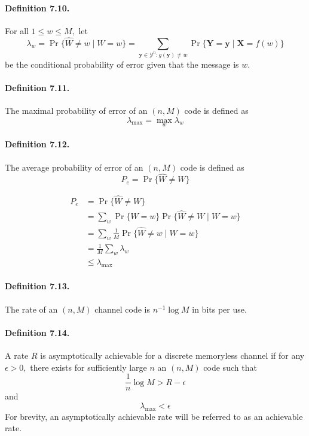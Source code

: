 \documentclass[8pt]{article}
\begin{document}
\begin{tcolorbox}
	\paragraph{Definition 7.10.} For all $1 \leq w \leq M,$ let
	$$
	\lambda_{w}=\operatorname{Pr}\{\hat{W} \neq w \mid W=w\}=\sum_{\mathbf{y} \in \mathcal{Y}^{n}: g(\mathbf{y}) \neq w} \operatorname{Pr}\{\mathbf{Y}=\mathbf{y} \mid \mathbf{X}=f(w)\}
	$$
	be the conditional probability of error given that the message is $w$.
	
	\paragraph{Definition 7.11.} The maximal probability of error of an $(n, M)$ code is defined as
	$$
	\lambda_{\max }=\max _{w} \lambda_{w}
	$$
	
	\paragraph{Definition 7.12.} The average probability of error of an $(n, M)$ code is defined as
	$$
	P_{e}=\operatorname{Pr}\{\hat{W} \neq W\}
	$$
\end{tcolorbox}
$$
\begin{aligned}
P_{e} &=\operatorname{Pr}\{\hat{W} \neq W\} \\
&=\sum_{w} \operatorname{Pr}\{W=w\} \operatorname{Pr}\{\hat{W} \neq W \mid W=w\} \\
&=\sum_{w} \frac{1}{M} \operatorname{Pr}\{\hat{W} \neq w \mid W=w\} \\
&=\frac{1}{M} \sum_{w} \lambda_{w} \\
&\leq \lambda_{\max }
\end{aligned}
$$

\begin{tcolorbox}
	\paragraph{Definition 7.13.} The rate of an $(n, M)$ channel code is $n^{-1} \log M$ in bits per use.
\end{tcolorbox}

\begin{tcolorbox}
	\paragraph{Definition 7.14.} A rate $R$ is asymptotically achievable for a discrete memoryless channel if for any $\epsilon>0,$ there exists for sufficiently large $n$ an $(n, M)$ code such that
	$$
	\frac{1}{n} \log M>R-\epsilon
	$$
	and
	$$
	\lambda_{\max }<\epsilon
	$$
	For brevity, an asymptotically achievable rate will be referred to as an achievable rate.
\end{tcolorbox}
\end{document}
